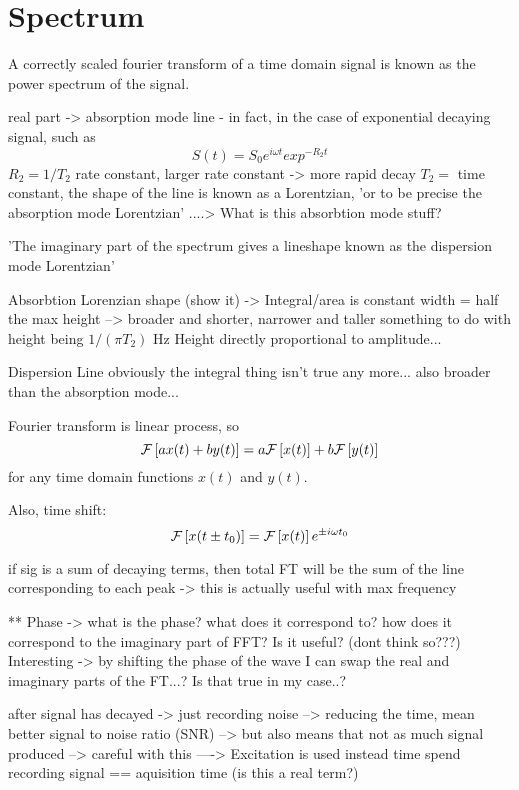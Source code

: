 \section{Spectrum}
A correctly scaled fourier transform of a time domain signal is known as the power spectrum of the signal.

real part -> absorption mode line
  - in fact, in the case of exponential decaying signal, such as
$$
  S(t) = S_0 e^{i \omega t}exp^{ -R_2 t }
$$
$R_2 = 1 / T_2$ rate constant, larger rate constant -> more rapid decay
$T_2 = $ time constant,
the shape of the line is known as a Lorentzian, 'or to be precise the absorption
mode Lorentzian' ....> What is this absorbtion mode stuff?

'The imaginary part of the spectrum gives a lineshape known as the dispersion
mode Lorentzian'

Absorbtion Lorenzian shape (show it)
-> Integral/area is constant
width = half the max height
--> broader and shorter, narrower and taller
something to do with height being $1/(\pi T_2)$ Hz %
Height directly proportional to amplitude...

Dispersion Line
obviously the integral thing isn't true any more...
also broader than the absorption mode...

Fourier transform is linear process, so
\begin{equation}
\mathcal{F}\left[a x(t) + b y(t) \right] = a \mathcal{F}\left[x(t)\right] + b \mathcal{F}\left[y(t)\right]
\end{equation}
for any time domain functions $x(t)$ and $y(t)$.

Also, time shift:
$$
\mathcal{F}\left[x(t \pm t_0)\right] = \mathcal{F}\left[x(t)\right] e^{\pm i \omega t_0}
$$

if sig is a sum of decaying terms, then total FT will be the sum of the line
corresponding to each peak
-> this is actually useful with max frequency

** Phase
-> what is the phase? what does it correspond to? how does it correspond to the
imaginary part of FFT?
Is it useful? (dont think so???)
Interesting -> by shifting the phase of the wave I can swap the real and
imaginary parts of the FT...? Is that true in my case..?

after signal has decayed -> just recording noise
--> reducing the time, mean better signal to noise ratio (SNR)
--> but also means that not as much signal produced
--> careful with this
----> Excitation is used instead
time spend recording signal == aquisition time (is this a real term?)

